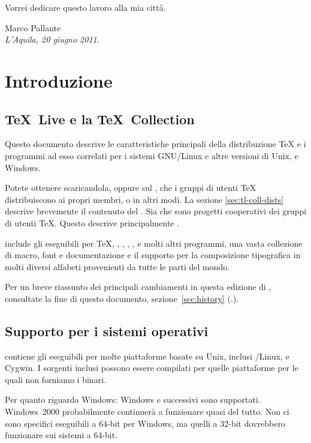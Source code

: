 \documentclass{article}
\begin{document}
Vorrei dedicare questo lavoro alla mia città.

\bigskip

\noindent Marco Pallante\\
\emph{L'Aquila, 20 giugno 2011}.


\section{Introduzione}
\label{sec:intro}

\subsection{\TeX\ Live e la \TeX\ Collection}

Questo documento descrive le caratteristiche principali della
distribuzione \TL{}\Dash \TeX{} e i programmi ad esso correlati per
i sistemi GNU/Linux e altre versioni di Unix, \MacOSX{} e Windows.

Potete ottenere \TL{} scaricandola, oppure sul \DVD{} \TK, che i gruppi di
utenti \TeX{} distribuiscono ai propri membri, o in altri modi. La sezione
\ref{sec:tl-coll-dists} descrive brevemente il contenuto del \DVD. Sia
\TL{} che \TK{} sono progetti cooperativi dei gruppi di utenti \TeX.
Questo descrive principalmente \TL.

\TL{} include gli eseguibili per \TeX, \LaTeXe, \ConTeXt, \MF, \MP,
\BibTeX{} e molti altri programmi, una vasta collezione di macro, font e
documentazione e il supporto per la composizione tipografica in molti
diversi alfabeti provenienti da tutte le parti del mondo.

Per un breve riassunto dei principali cambiamenti in questa edizione di
\TL, consultate la fine di questo documento, sezione~\ref{sec:history}
(\p.\pageref{sec:history}).



\subsection{Supporto per i sistemi operativi}
\label{sec:os-support}

\TL{} contiene gli eseguibili per molte piattaforme basate su Unix,
inclusi \GNU/Linux, \MacOSX{} e Cygwin. I sorgenti inclusi possono essere
compilati per quelle piattaforme per le quali non forniamo i binari.

Per quanto riguarda Windows: Windows  e successivi sono supportati.
Windows~2000 probabilmente continuerà a funzionare quasi del tutto.  Non ci
sono specifici eseguibili a 64-bit per Windows, ma quelli a 32-bit
dovrebbero funzionare sui sistemi a 64-bit.
\end{document}
